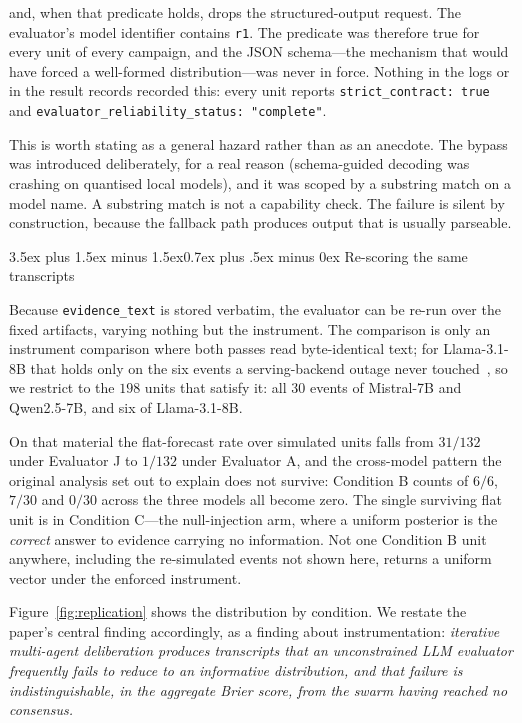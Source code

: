 \documentclass[10pt,conference]{IEEEtran}
\makeatletter
\renewcommand\subsection{\@startsection{subsection}{2}{\z@}%
  {3.5ex plus 1.5ex minus 1.5ex}{0.7ex plus .5ex minus 0ex}%
  {\normalfont\normalsize\bfseries}}
\makeatother
\begin{document}
and, when that predicate holds, drops the structured-output request. The evaluator's model identifier contains \texttt{r1}. The predicate was therefore true for every unit of every campaign, and the JSON schema---the mechanism that would have forced a well-formed distribution---was never in force. Nothing in the logs or in the result records recorded this: every unit reports \texttt{strict\_contract: true} and \texttt{evaluator\_reliability\_status: "complete"}.

This is worth stating as a general hazard rather than as an anecdote. The bypass was introduced deliberately, for a real reason (schema-guided decoding was crashing on quantised local models), and it was scoped by a substring match on a model name. A substring match is not a capability check. The failure is silent by construction, because the fallback path produces output that is usually parseable.

\subsection{Re-scoring the same transcripts}

Because \texttt{evidence\_text} is stored verbatim, the evaluator can be re-run over the fixed artifacts, varying nothing but the instrument. The comparison is only an instrument comparison where both passes read byte-identical text; for Llama-3.1-8B that holds only on the six events a serving-backend outage never touched~\cite{techreport}, so we restrict to the $198$ units that satisfy it: all $30$ events of Mistral-7B and Qwen2.5-7B, and six of Llama-3.1-8B.

On that material the flat-forecast rate over simulated units falls from $31/132$ under Evaluator J to $1/132$ under Evaluator A, and the cross-model pattern the original analysis set out to explain does not survive: Condition B counts of $6/6$, $7/30$ and $0/30$ across the three models all become zero. The single surviving flat unit is in Condition C---the null-injection arm, where a uniform posterior is the \emph{correct} answer to evidence carrying no information. Not one Condition B unit anywhere, including the re-simulated events not shown here, returns a uniform vector under the enforced instrument.

Figure~\ref{fig:replication} shows the distribution by condition. We restate the paper's central finding accordingly, as a finding about instrumentation: \emph{iterative multi-agent deliberation produces transcripts that an unconstrained LLM evaluator frequently fails to reduce to an informative distribution, and that failure is indistinguishable, in the aggregate Brier score, from the swarm having reached no consensus.}
\end{document}
